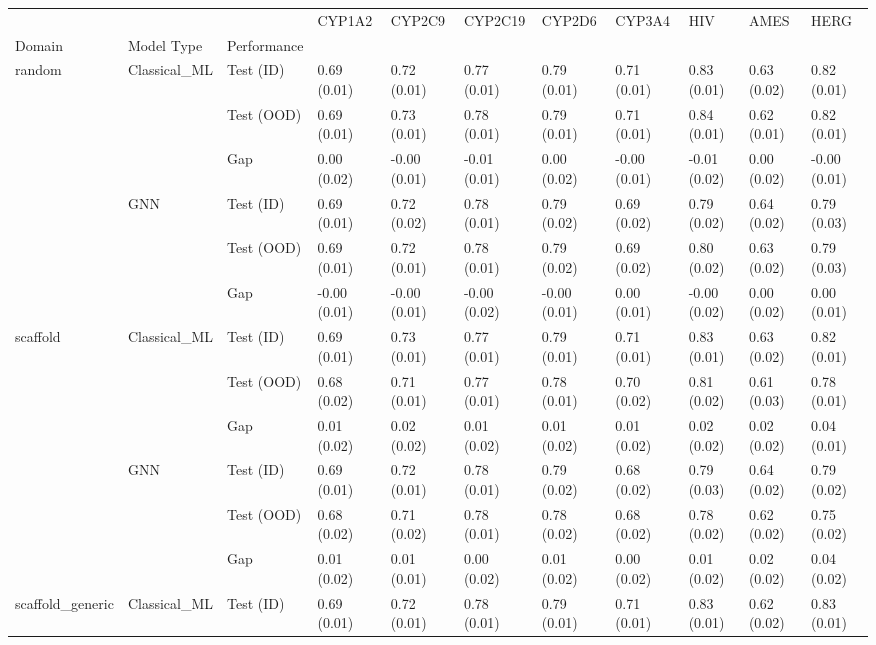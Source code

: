 \begin{tabular}{lllllllllll}
\toprule
 &  &  & CYP1A2 & CYP2C9 & CYP2C19 & CYP2D6 & CYP3A4 & HIV & AMES & HERG \\
Domain & Model Type & Performance &  &  &  &  &  &  &  &  \\
\midrule
\multirow[t]{6}{*}{random} & \multirow[t]{3}{*}{Classical_ML} & Test (ID) & 0.69 (0.01) & 0.72 (0.01) & 0.77 (0.01) & 0.79 (0.01) & 0.71 (0.01) & 0.83 (0.01) & 0.63 (0.02) & 0.82 (0.01) \\
 &  & Test (OOD) & 0.69 (0.01) & 0.73 (0.01) & 0.78 (0.01) & 0.79 (0.01) & 0.71 (0.01) & 0.84 (0.01) & 0.62 (0.01) & 0.82 (0.01) \\
 &  & Gap & 0.00 (0.02) & -0.00 (0.01) & -0.01 (0.01) & 0.00 (0.02) & -0.00 (0.01) & -0.01 (0.02) & 0.00 (0.02) & -0.00 (0.01) \\
\cline{2-11}
 & \multirow[t]{3}{*}{GNN} & Test (ID) & 0.69 (0.01) & 0.72 (0.02) & 0.78 (0.01) & 0.79 (0.02) & 0.69 (0.02) & 0.79 (0.02) & 0.64 (0.02) & 0.79 (0.03) \\
 &  & Test (OOD) & 0.69 (0.01) & 0.72 (0.01) & 0.78 (0.01) & 0.79 (0.02) & 0.69 (0.02) & 0.80 (0.02) & 0.63 (0.02) & 0.79 (0.03) \\
 &  & Gap & -0.00 (0.01) & -0.00 (0.01) & -0.00 (0.02) & -0.00 (0.01) & 0.00 (0.01) & -0.00 (0.02) & 0.00 (0.02) & 0.00 (0.01) \\
\cline{1-11} \cline{2-11}
\multirow[t]{6}{*}{scaffold} & \multirow[t]{3}{*}{Classical_ML} & Test (ID) & 0.69 (0.01) & 0.73 (0.01) & 0.77 (0.01) & 0.79 (0.01) & 0.71 (0.01) & 0.83 (0.01) & 0.63 (0.02) & 0.82 (0.01) \\
 &  & Test (OOD) & 0.68 (0.02) & 0.71 (0.01) & 0.77 (0.01) & 0.78 (0.01) & 0.70 (0.02) & 0.81 (0.02) & 0.61 (0.03) & 0.78 (0.01) \\
 &  & Gap & 0.01 (0.02) & 0.02 (0.02) & 0.01 (0.02) & 0.01 (0.02) & 0.01 (0.02) & 0.02 (0.02) & 0.02 (0.02) & 0.04 (0.01) \\
\cline{2-11}
 & \multirow[t]{3}{*}{GNN} & Test (ID) & 0.69 (0.01) & 0.72 (0.01) & 0.78 (0.01) & 0.79 (0.02) & 0.68 (0.02) & 0.79 (0.03) & 0.64 (0.02) & 0.79 (0.02) \\
 &  & Test (OOD) & 0.68 (0.02) & 0.71 (0.02) & 0.78 (0.01) & 0.78 (0.02) & 0.68 (0.02) & 0.78 (0.02) & 0.62 (0.02) & 0.75 (0.02) \\
 &  & Gap & 0.01 (0.02) & 0.01 (0.01) & 0.00 (0.02) & 0.01 (0.02) & 0.00 (0.02) & 0.01 (0.02) & 0.02 (0.02) & 0.04 (0.02) \\
\cline{1-11} \cline{2-11}
\multirow[t]{6}{*}{scaffold_generic} & \multirow[t]{3}{*}{Classical_ML} & Test (ID) & 0.69 (0.01) & 0.72 (0.01) & 0.78 (0.01) & 0.79 (0.01) & 0.71 (0.01) & 0.83 (0.01) & 0.62 (0.02) & 0.83 (0.01) \\

\end{tabular}

